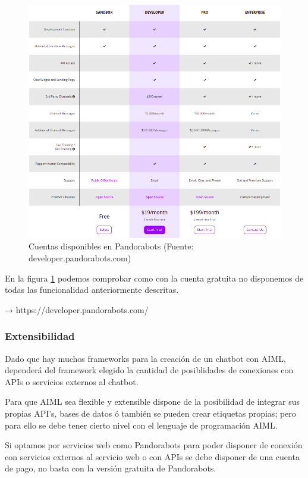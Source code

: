 \begin{figure}[h]
    \centering
    \includegraphics[width=1.0\textwidth]{imagenes/04_Analisis/cuentas_pandorabots.png}
    \caption{Cuentas disponibles en Pandorabots (Fuente: developer.pandorabots.com)}
    \label{fig:cuenta_pandorabots}
\end{figure}

En la figura \ref{fig:cuenta_pandorabots} podemos comprobar como con la cuenta gratuita no disponemos de todas las funcionalidad anteriormente descritas.


→ https://developer.pandorabots.com/


\subsubsection*{Extensibilidad}

Dado que hay muchos frameworks para la creación de un chatbot con AIML, dependerá del framework elegido la cantidad de posiblidades de conexiones con APIs o servicios externos al chatbot. 

Para que AIML sea flexible y extensible dispone de la posibilidad de integrar sus propias API's, bases de datos ó también se pueden crear etiquetas propias; pero para ello se debe tener cierto nivel con el lenguaje de programación AIML.

Si optamos por servicios web como Pandorabots para poder disponer de conexión con servicios externos al servicio web o con APIs se debe disponer de una cuenta de pago, no basta con la versión gratuita de Pandorabots.

